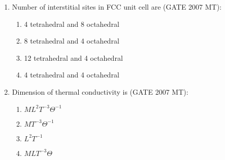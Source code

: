 \documentclass[12pt]{article}
\begin{document}
\begin{enumerate}
\item Number of interstitial sites in FCC unit cell are (GATE 2007 MT):
    \begin{enumerate}
        \item 4 tetrahedral and 8 octahedral
        \item 8 tetrahedral and 4 octahedral
        \item 12 tetrahedral and 4 octahedral
        \item 4 tetrahedral and 4 octahedral
    \end{enumerate}

\item Dimension of thermal conductivity is (GATE 2007 MT):
    \begin{enumerate}
        \item $ML^2T^{-3}\Theta^{-1}$
        \item $MT^{-3}\Theta^{-1}$
        \item $L^2T^{-1}$
        \item $MLT^{-3}\Theta$
    \end{enumerate}

\end{enumerate}
\end{document}

